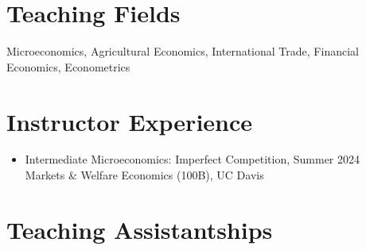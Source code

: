 \documentclass{article}[12]
\begin{document}
\section{Teaching Fields}

Microeconomics, Agricultural Economics, International Trade, Financial Economics, Econometrics


\section{Instructor Experience}

\begin{itemize}[itemsep=0.5em]


        \item Intermediate Microeconomics: Imperfect Competition,  \hfill Summer 2024 \\Markets \& Welfare Economics (100B), UC Davis


\end{itemize}

\section{Teaching Assistantships}
\end{document}

